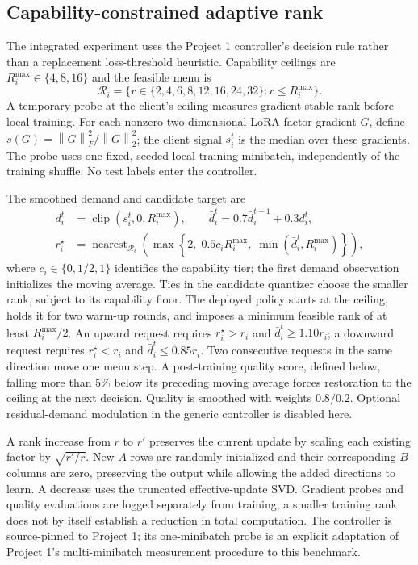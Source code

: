 \documentclass[11pt]{article}
\newcommand{\norm}[1]{\left\lVert#1\right\rVert}
\newcommand{\clip}{\operatorname{clip}}
\begin{document}
\subsection{Capability-constrained adaptive rank}
The integrated experiment uses the Project 1 controller's decision rule rather than a replacement loss-threshold heuristic. Capability ceilings are $R_i^{\max}\in\{4,8,16\}$ and the feasible menu is
\begin{equation}
 \mathcal R_i=\{r\in\{2,4,6,8,12,16,24,32\}:r\le R_i^{\max}\}.
\end{equation}
A temporary probe at the client's ceiling measures gradient stable rank before local training. For each nonzero two-dimensional LoRA factor gradient $G$, define $s(G)=\norm{G}_F^2/\norm{G}_2^2$; the client signal $s_i^t$ is the median over these gradients. The probe uses one fixed, seeded local training minibatch, independently of the training shuffle. No test labels enter the controller.

The smoothed demand and candidate target are
\begin{align}
 d_i^t&=\clip(s_i^t,0,R_i^{\max}),\qquad
 \bar d_i^t=0.7\bar d_i^{t-1}+0.3d_i^t,\\
 r_i^\star&=\operatorname{nearest}_{\mathcal R_i}
 \left(\max\left\{2,\;0.5c_iR_i^{\max},\;\min(\bar d_i^t,R_i^{\max})\right\}\right),
 \label{eq:rank-target}
\end{align}
where $c_i\in\{0,1/2,1\}$ identifies the capability tier; the first demand observation initializes the moving average. Ties in the candidate quantizer choose the smaller rank, subject to its capability floor. The deployed policy starts at the ceiling, holds it for two warm-up rounds, and imposes a minimum feasible rank of at least $R_i^{\max}/2$. An upward request requires $r_i^\star>r_i$ and $\bar d_i^t\ge1.10r_i$; a downward request requires $r_i^\star<r_i$ and $\bar d_i^t\le0.85r_i$. Two consecutive requests in the same direction move one menu step. A post-training quality score, defined below, falling more than 5\% below its preceding moving average forces restoration to the ceiling at the next decision. Quality is smoothed with weights $0.8/0.2$. Optional residual-demand modulation in the generic controller is disabled here.

A rank increase from $r$ to $r'$ preserves the current update by scaling each existing factor by $\sqrt{r'/r}$. New $A$ rows are randomly initialized and their corresponding $B$ columns are zero, preserving the output while allowing the added directions to learn. A decrease uses the truncated effective-update SVD. Gradient probes and quality evaluations are logged separately from training; a smaller training rank does not by itself establish a reduction in total computation. The controller is source-pinned to Project 1; its one-minibatch probe is an explicit adaptation of Project 1's multi-minibatch measurement procedure to this benchmark.
\end{document}
